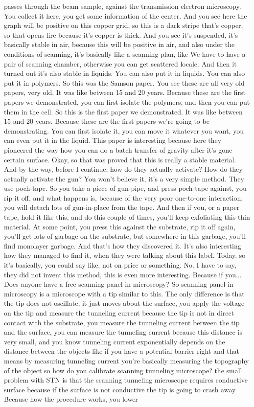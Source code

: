 passes through the beam sample, against the transmission electron microscopy. You collect it here, you get some information of the center. And you see here the graph will be positive on this copper grid, so this is a dark stripe that's copper, so that opens fire because it's copper is thick. And you see it's suspended, it's basically stable in air, because this will be positive in air, and also under the conditions of scanning, it's basically like a scanning plan, like We have to have a pair of scanning chamber, otherwise you can get scattered locale. And then it turned out it's also stable in liquids. You can also put it in liquids. You can also put it in polymers. So this was the Samson paper. You see these are all very old papers, very old. It was like between 15 and 20 years. Because these are the first papers we demonstrated, you can first isolate the polymers, and then you can put them in the cell. So this is the first paper we demonstrated. It was like between 15 and 20 years. Because these are the first papers we're going to be demonstrating. You can first isolate it, you can move it whatever you want, you can even put it in the liquid. This paper is interesting because here they pioneered the way how you can do a batch transfer of gravity after it's gone certain surface. Okay, so that was proved that this is really a stable material. And by the way, before I continue, how do they actually activate? How do they actually activate the gun? You won't believe it, it's a very simple method. They use poch-tape. So you take a piece of gun-pipe, and press poch-tape against, you rip it off, and what happens is, because of the very poor one-to-one interaction, you will detach lots of gun-in-place from the tape. And then if you, or a paper tape, hold it like this, and do this couple of times, you'll keep exfoliating this thin material. At some point, you press this against the substrate, rip it off again, you'll get lots of garbage on the substrate, but somewhere in this garbage, you'll find monolayer garbage. And that's how they discovered it. It's also interesting how they managed to find it, when they were talking about this label. Today, so it's basically, you could say like, not on price or something. No. I have to say, they did not invent this method, this is even more interesting. Because if you... Does anyone have a free scanning panel in microscopy? So scanning panel in microscopy is a microscope with a tip similar to this. The only difference is that the tip does not oscillate, it just moves about the surface, you apply the voltage on the tip and measure the tunneling current because the tip is not in direct contact with the substrate, you measure the tunneling current between the tip and the surface, you can measure the tunneling current because this distance is very small, and you know tunneling current exponentially depends on the distance between the objects like if you have a potential barrier right and that means by measuring tunneling current you're basically measuring the topography of the object so how do you calibrate scanning tunneling microscope? the small problem with STN is that the scanning tunneling microscope requires conductive surface because if the surface is not conductive the tip is going to crash away Because how the procedure works, you lower 